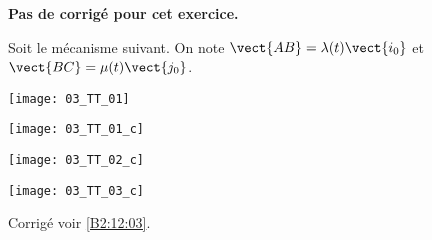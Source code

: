 \normaltrue
\correctiontrue



\setcounter{question}{0}
\ifcorrection
\else
\textbf{Pas de corrigé pour cet exercice.}
\fi

\ifprof
\else
Soit le mécanisme suivant. On note $\vect{AB}=\lambda(t)\vect{i_0}$ et $\vect{BC}=\mu(t)\vect{j_0}$.
\begin{center}
\texttt{[image: 03\_TT\_01]}
\end{center}
\fi

\ifprof
\begin{multicols}{3}
\else
\fi
{}
\ifprof
\begin{center}
\texttt{[image: 03\_TT\_01\_c]}
\end{center}
\else
\fi

\ifprof
\begin{center}
\texttt{[image: 03\_TT\_02\_c]}
\end{center}
\else
\fi

\ifprof
\begin{center}
\texttt{[image: 03\_TT\_03\_c]}
\end{center}
\else
\fi


\ifprof
\end{multicols}
\else
\fi

\ifprof
\else
\begin{flushright}
\footnotesize{Corrigé  voir \ref{B2:12:03}.}
\end{flushright}%
\fi


